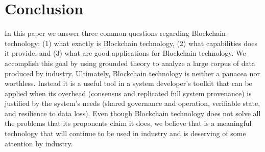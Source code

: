 
\section{Conclusion}
In this paper we answer three common questions regarding Blockchain technology: (1) what exactly is Blockchain technology, (2) what capabilities does it provide, and (3) what are good applications for Blockchain technology.
We accomplish this goal by using grounded theory to analyze a large corpus of data produced by industry.
Ultimately, Blockchain technology is neither a panacea nor worthless.
Instead it is a useful tool in a system developer's toolkit that can be applied when its overhead (consensus and replicated full system provenance) is justified by the system's needs (shared governance and operation, verifiable state, and resilience to data loss).
Even though Blockchain technology does not solve all the problems that its proponents claim it does, we believe that is a meaningful technology that will continue to be used in industry and is deserving of some attention by industry.